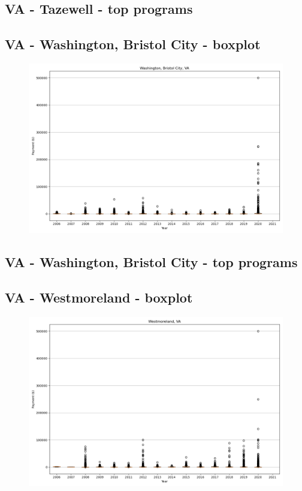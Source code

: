 \subsection*{VA - Tazewell - top programs}

\newpage
\subsection*{VA - Washington, Bristol City - boxplot}
\begin{figure}[h]
\centering
\includegraphics[width=7in]{../output/boxplots/counties/Washington, Bristol City-VA_boxplot.png}
\end{figure}


\subsection*{VA - Washington, Bristol City - top programs}

\newpage
\subsection*{VA - Westmoreland - boxplot}
\begin{figure}[h]
\centering
\includegraphics[width=7in]{../output/boxplots/counties/Westmoreland-VA_boxplot.png}
\end{figure}


